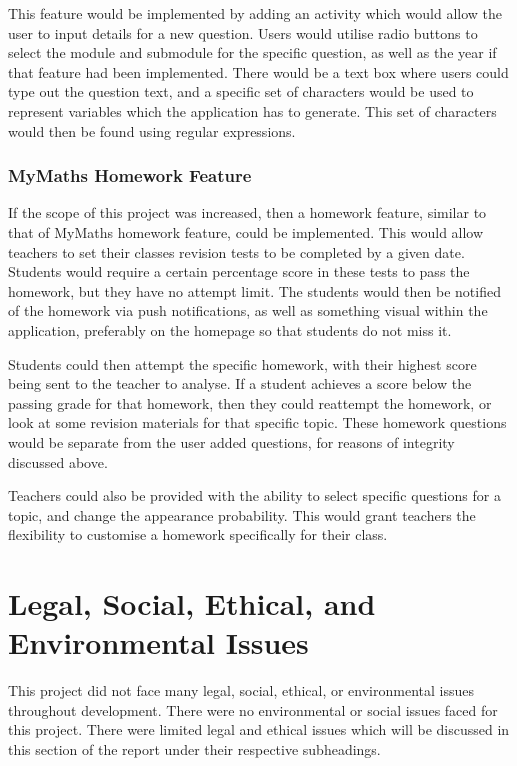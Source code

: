 \documentclass{article}
\begin{document}
This feature would be implemented by adding an activity which would allow the user to input details for a new question. Users would utilise radio buttons to select the module and submodule for the specific question, as well as the year if that feature had been implemented. There would be a text box where users could type out the question text, and a specific set of characters would be used to represent variables which the application has to generate. This set of characters would then be found using regular expressions. \par

\subsubsection{MyMaths Homework Feature}

If the scope of this project was increased, then a homework feature, similar to that of MyMaths homework feature, could be implemented. This would allow teachers to set their classes revision tests to be completed by a given date. Students would require a certain percentage score in these tests to pass the homework, but they have no attempt limit. The students would then be notified of the homework via push notifications, as well as something visual within the application, preferably on the homepage so that students do not miss it. \par

Students could then attempt the specific homework, with their highest score being sent to the teacher to analyse. If a student achieves a score below the passing grade for that homework, then they could reattempt the homework, or look at some revision materials for that specific topic. These homework questions would be separate from the user added questions, for reasons of integrity discussed above. \par

Teachers could also be provided with the ability to select specific questions for a topic, and change the appearance probability. This would grant teachers the flexibility to customise a homework specifically for their class. \par

\section{Legal, Social, Ethical, and Environmental Issues}
\label{section:issues}

This project did not face many legal, social, ethical, or environmental issues throughout development. There were no environmental or social issues faced for this project. There were limited legal and ethical issues which will be discussed in this section of the report under their respective subheadings. 
\end{document}
